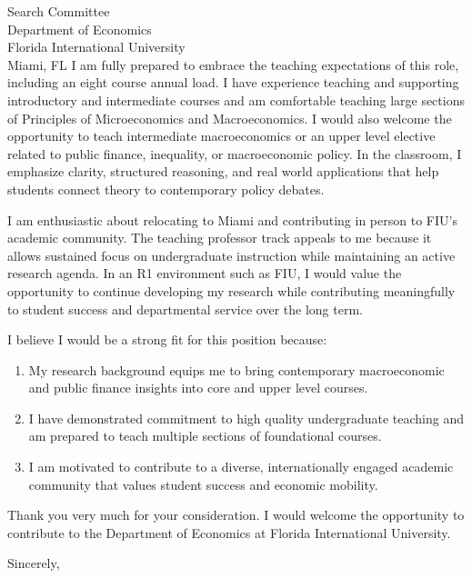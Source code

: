 \documentclass[11pt,letterpaper]{letter}
\begin{document}
\begin{letter}{
Search Committee \\
Department of Economics \\
Florida International University \\
Miami, FL
}
I am fully prepared to embrace the teaching expectations of this role, including an eight course annual load. I have experience teaching and supporting introductory and intermediate courses and am comfortable teaching large sections of Principles of Microeconomics and Macroeconomics. I would also welcome the opportunity to teach intermediate macroeconomics or an upper level elective related to public finance, inequality, or macroeconomic policy. In the classroom, I emphasize clarity, structured reasoning, and real world applications that help students connect theory to contemporary policy debates. 

I am enthusiastic about relocating to Miami and contributing in person to FIU’s academic community. The teaching professor track appeals to me because it allows sustained focus on undergraduate instruction while maintaining an active research agenda. In an R1 environment such as FIU, I would value the opportunity to continue developing my research while contributing meaningfully to student success and departmental service over the long term.

I believe I would be a strong fit for this position because:
\begin{enumerate}
    \item My research background equips me to bring contemporary macroeconomic and public finance insights into core and upper level courses.
    \item I have demonstrated commitment to high quality undergraduate teaching and am prepared to teach multiple sections of foundational courses.
    \item I am motivated to contribute to a diverse, internationally engaged academic community that values student success and economic mobility.
\end{enumerate}

Thank you very much for your consideration. I would welcome the opportunity to contribute to the Department of Economics at Florida International University.

\closing{Sincerely,}

\end{letter}
\end{document}
